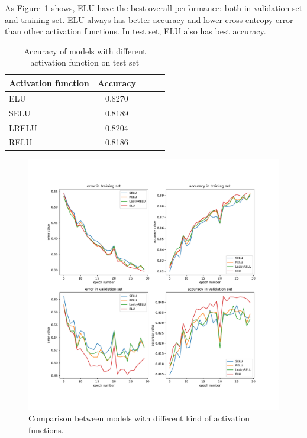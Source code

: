 \documentclass{article}
\begin{document}
As Figure~\ref{fig:base_act_func} shows, ELU have the best overall performance: both in validation set and training set. ELU always has better accuracy and lower cross-entropy error than other activation functions. In test set, ELU also has best accuracy.


\begin{table}[tb]
\vskip 3mm
\begin{center}
\begin{small}
\begin{sc}
\begin{tabular}{lcccr}
\hline
\abovespace\belowspace
Activation function & Accuracy \\
\hline
\abovespace
ELU    	& 0.8270 	\\
SELU 	& 0.8189 	\\
LRELU  	& 0.8204 	\\
RELU	& 0.8186	\\

\hline
\end{tabular}
\end{sc}
\end{small}
\caption{Accuracy of models with different activation function on test set}
\label{tab:activation_func}
\end{center}
\vskip -3mm
\end{table}


\begin{figure}[tb]
\begin{center}
\centerline{\includegraphics[width=\columnwidth]{fig/activation_function.pdf}}
\caption{Comparison between models with different kind of activation functions.}
\label{fig:base_act_func}
\end{center}
\end{figure} 
\end{document}
